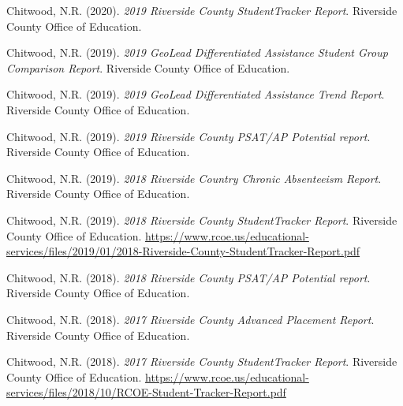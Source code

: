 

    \begin{pubitems} %
      \item {Chitwood, N.R. (2020). \textit{2019 Riverside County StudentTracker Report}. Riverside County Office of Education.}
      \item {Chitwood, N.R. (2019). \textit{2019 GeoLead Differentiated Assistance Student Group Comparison Report}. Riverside County Office of Education.}
      \item {Chitwood, N.R. (2019). \textit{2019 GeoLead Differentiated Assistance Trend Report}. Riverside County Office of Education.}
      \item {Chitwood, N.R. (2019). \textit{2019 Riverside County PSAT/AP Potential report}. Riverside County Office of Education.}
      \item {Chitwood, N.R. (2019). \textit{2018 Riverside Country Chronic Absenteeism Report}. Riverside County Office of Education.}
      \item {Chitwood, N.R. (2019). \textit{2018 Riverside County StudentTracker Report}. Riverside County Office of Education. \url{https://www.rcoe.us/educational-services/files/2019/01/2018-Riverside-County-StudentTracker-Report.pdf}}
      \item {Chitwood, N.R. (2018). \textit{2018 Riverside County PSAT/AP Potential report}. Riverside County Office of Education.}
      \item {Chitwood, N.R. (2018). \textit{2017 Riverside County Advanced Placement Report}. Riverside County Office of Education.}
      \item {Chitwood, N.R. (2018). \textit{2017 Riverside County StudentTracker Report}. Riverside County Office of Education. \url{https://www.rcoe.us/educational-services/files/2018/10/RCOE-Student-Tracker-Report.pdf}}
    \end{pubitems}

